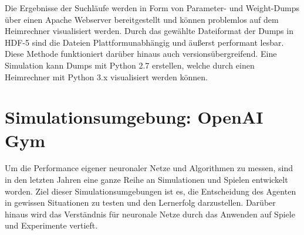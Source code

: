 	Die Ergebnisse der Suchläufe werden in Form von Parameter- und Weight-Dumps über einen Apache Webserver bereitgestellt und können problemlos auf dem Heimrechner visualisiert werden. Durch das gewählte Dateiformat der Dumps in HDF-5 \cite{hdf5} sind die Dateien Plattformunabhängig und äußerst performant lesbar. Diese Methode funktioniert darüber hinaus auch versionsübergreifend. Eine Simulation kann Dumps mit Python 2.7 erstellen, welche durch einen Heimrechner mit Python 3.x visualisiert werden können.

\section{Simulationsumgebung: OpenAI Gym}
\label{sec:imp_sim}
	Um die Performance eigener neuronaler Netze und Algorithmen zu messen, sind in den letzten Jahren eine ganze Reihe an Simulationen und Spielen entwickelt worden. Ziel dieser Simulationsumgebungen ist es, die Entscheidung des Agenten in gewissen Situationen zu testen und den Lernerfolg darzustellen. Darüber hinaus wird das Verständnis für neuronale Netze durch das Anwenden auf Spiele und Experimente vertieft.
	
